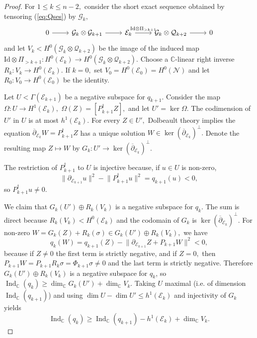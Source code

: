 \documentclass[11pt]{article}
\theoremstyle{definition}
\newcommand{\C}{\mathbb{C}}
\newcommand{\delbar}{\overline{\partial}}
\numberwithin{equation}{section}
\begin{document}
\begin{proof}
	For $1 \leq k \leq n-2,$ consider the short exact sequence obtained by tensoring (\ref{eq:Qses}) by $\mathcal{G}_k,$
	\begin{equation}\label{eq:genses}
		\begin{tikzcd}
			0 & {\mathcal{G}_k \otimes \mathcal{G}_{k+1}} & {\mathcal{E}_k} & {\mathcal{G}_k \otimes \mathcal{Q}_{k+2}} & 0
			\arrow[from=1-1, to=1-2]
			\arrow[from=1-2, to=1-3]
			\arrow["{\mathrm{Id} \otimes \Pi_{>k+1}}", from=1-3, to=1-4]
			\arrow[from=1-4, to=1-5]
		\end{tikzcd} 
	\end{equation}
	and let $V_k < H^0(\mathcal{G}_k \otimes \mathcal{Q}_{k+2})$ be the image of the induced map $\mathrm{Id} \otimes \Pi_{>k+1}: H^0(\mathcal{E}_k) \to H^0(\mathcal{G}_k \otimes \mathcal{Q}_{k+2}).$ Choose a $\C$-linear right inverse $R_k: V_k \to H^0(\mathcal{E}_k).$ If $k=0,$ set $V_0 = H^0(\mathcal{E}_0) = H^0(\mathcal{N})$ and let $R_0 : V_0 \to H^0(\mathcal{E}_0)$ be the identity.
	
	Let $U < \Gamma(\mathcal{E}_{k+1})$ be a negative subspace for $q_{k+1}.$ Consider the map $\Omega: U \to H^1(\mathcal{E}_k),$ $\Omega(Z) = \left[P_{k+1}^\dagger Z\right],$ and let $U' = \ker \Omega.$ The codimension of $U'$ in $U$ is at most $h^1(\mathcal{E}_k).$ For every $Z \in U',$ Dolbeault theory implies the equation $\delbar_{\mathcal{E}_k} W = P_{k+1}^\dagger Z$ has a unique solution $W \in \ker(\delbar_{\mathcal{E}_k})^\perp.$ Denote the resulting map $Z \mapsto W$ by $G_k : U' \to \ker(\delbar_{\mathcal{E}_k})^\perp.$
	
	The restriction of $P_{k+1}^\dagger$ to $U$ is injective because, if $u \in U$ is non-zero,
	\begin{equation*}
		\lVert \partial_{\mathcal{E}_{k+1}} u \rVert^2 - \lVert P_{k+1}^\dagger u \rVert^2 = q_{k+1}(u) < 0,
	\end{equation*}
	so $P_{k+1}^\dagger u \neq 0$.
	
	We claim that $G_k(U') \oplus R_k(V_k)$ is a negative subspace for $q_k$. The sum is direct because $R_k(V_k) < H^0(\mathcal{E}_k)$ and the codomain of $G_k$ is $\ker(\delbar_{\mathcal{E}_k})^\perp.$ For non-zero $W = G_k(Z)+R_k(\sigma) \in G_k(U') \oplus R_k(V_k),$ we have
	\begin{equation*}
		q_k(W) = q_{k+1}(Z) - \lVert \partial_{\mathcal{E}_{k+1}} Z +  P_{k+1} W \rVert^2 < 0,
	\end{equation*}
	because if $Z \neq 0$ the first term is strictly negative, and if $Z = 0,$ then $P_{k+1} W = P_{k+1} R_k \sigma = \Phi_{k+1} \sigma \neq 0$ and the last term is strictly negative. Therefore $G_k(U') \oplus R_k(V_k)$ is a negative subspace for $q_k$, so $\operatorname{Ind}_{\C}(q_k) \geq \dim_{\C} G_k(U') + \dim_{\C} V_k$. Taking $U$ maximal (i.e. of dimension $\operatorname{Ind}_\C(q_{k+1})$) and using $\dim U - \dim U' \leq h^1(\mathcal{E}_k)$ and injectivity of $G_k$ yields
	\begin{equation*}
		\operatorname{Ind}_{\C}(q_k) \geq \operatorname{Ind}_\C(q_{k+1}) - h^1(\mathcal{E}_k) + \dim_{\C} V_k.
	\end{equation*}
	

\end{proof}
\end{document}
